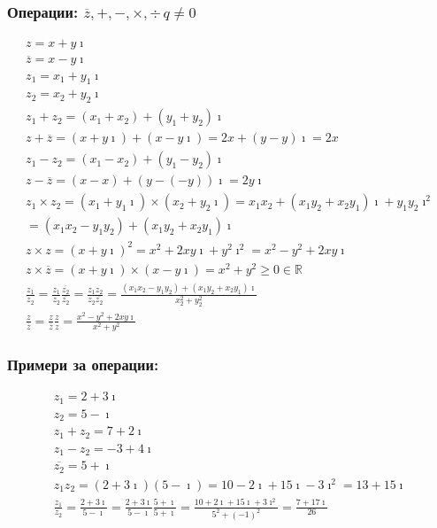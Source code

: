 \documentclass{article}
\begin{document}
    \subsubsection{Операции: \(\overline{z}, +, -, \times, \div \, q \neq 0\)}
    \begin{align*}
        z = x + y \imath\\
        \overline{z} = x - y \imath\\
        z_1 = x_1 + y_1 \imath\\
        z_2 = x_2 + y_2 \imath\\
        z_1 + z_2 = (x_1 + x_2) + (y_1 + y_2) \imath\\
        z + \overline{z} = (x + y \imath) + (x - y \imath) = 2x + (y - y) \imath = 2x\\
        z_1 - z_2 = (x_1 - x_2) + (y_1 - y_2) \imath\\
        z - \overline{z} = (x - x) + (y - (-y)) \imath = 2y \imath\\
        z_1 \times z_2 = (x_1 + y_1 \imath) \times (x_2 + y_2 \imath) = x_1 x_2 + (x_1 y_2 + x_2 y_1) \imath + y_1 y_2 \imath^2\\
        = (x_1 x_2 - y_1 y_2) + (x_1 y_2 + x_2 y_1) \imath\\
        z \times z = (x + y \imath)^2 = x^2 + 2xy \imath + y^2 \imath^2 =  x^2 - y^2 + 2xy \imath\\
        z \times \overline{z} = (x + y \imath) \times (x - y \imath) = x^2 + y^2 \geq 0 \in \mathbb{R}\\
        \frac{z_1}{z_2} = \frac{z_1}{z_2}\frac{\overline{z_2}}{\overline{z_2}} = \frac{z_1 z_2}{z_2 \overline{z_2}} = \frac{(x_1 x_2 - y_1 y_2) + (x_1 y_2 + x_2 y_1) \imath}{x_2^2 + y_2^2}\\
        \frac{z}{\overline{z}} = \frac{z}{\overline{z}}\frac{z}{z} =  \frac{x^2 - y^2 + 2xy \imath}{x^2 + y^2}
    \end{align*}
    \subsubsection{Примери за операции:}
    \begin{align*}
        z_1 = 2 + 3 \imath\\
        z_2 = 5 - \imath\\
        z_1 + z_2 = 7 + 2 \imath\\
        z_1 - z_2 = -3 + 4 \imath\\
        \overline{z_2} = 5 + \imath\\
        z_1z_2 = (2 + 3 \imath)(5 - \imath) = 10 - 2 \imath + 15 \imath - 3 \imath^2 = 13 + 15 \imath\\
        \frac{z_1}{z_2} = \frac{2 + 3 \imath}{5 - \imath} = \frac{2 + 3 \imath}{5 - \imath}\frac{5 + \imath}{5 + \imath} = \frac{10 + 2 \imath + 15 \imath + 3 \imath^2}{5^2 + (-1)^2} = \frac{7 + 17 \imath}{26}
    \end{align*}
\end{document}
